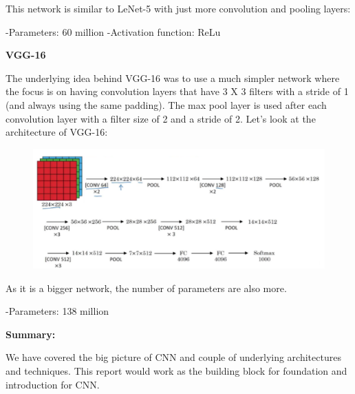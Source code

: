 \documentclass[a4paper]{article}
\begin{document}
This network is similar to LeNet-5 with just more convolution and pooling layers:

    -Parameters: 60 million
    -Activation function: ReLu
    
\clearpage  

\textbf{VGG-16  }  

The underlying idea behind VGG-16 was to use a much simpler network where the focus is on having convolution layers that have 3 X 3 filters with a stride of 1 (and always using the same padding). The max pool layer is used after each convolution layer with a filter size of 2 and a stride of 2. Let’s look at the architecture of VGG-16: 

{\begin{figure}[htp]
    \centering
    \includegraphics[width=15cm]{VGG-16.png}
\end{figure}}

As it is a bigger network, the number of parameters are also more.

   -Parameters: 138 million



\textbf{Summary:}

 We have covered the big picture of CNN and couple of underlying architectures and techniques. This report would work as the building block for foundation and introduction for CNN.
\end{document}
